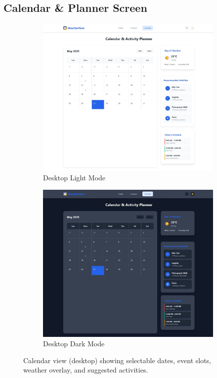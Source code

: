 \documentclass[fontsize=13pt,a4paper]{article}
\begin{document}
\subsection{Calendar \& Planner Screen}
\FloatBarrier
\begin{figure}[H]
  \centering
  \begin{subfigure}{0.48\linewidth}
    \includegraphics[width=\linewidth]{calendar_lightmode.jpeg}
    \caption{Desktop Light Mode}
  \end{subfigure}\hfill
  \begin{subfigure}{0.48\linewidth}
    \includegraphics[width=\linewidth]{calendar_darkmode.jpeg}
    \caption{Desktop Dark Mode}
  \end{subfigure}
  \caption{Calendar view (desktop) showing selectable dates, event slots, weather overlay, and suggested activities.}
  \label{fig:calendar_desktop}
\end{figure}
\FloatBarrier
\end{document}
